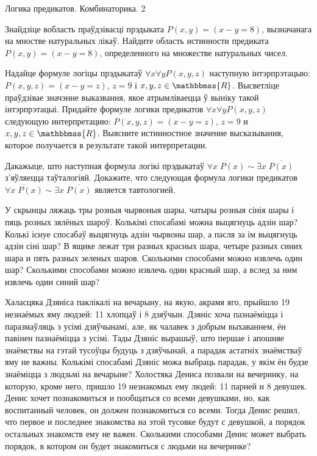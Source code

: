 \documentclass[11pt, a4paper]{article}
\begin{document}
\newpage

{Логика предикатов. Комбинаторика.}
{2}
 
\begin{problemList}

\problemItemSimple
{Знайдзіце вобласть праўдзівасці прэдыката $P(x, y) = (x - y = 8)$, вызначанага на мностве натуральных лікаў.}
{Найдите область истинности предиката $P(x, y) = (x - y = 8)$, определенного на множестве натуральных чисел.}

\medskip

\problemItemSimple
{Надайце формуле логіцы прэдыкатаў $\forall x \forall y P(x, y, z)$ наступную інтэрпрэтацыю: $P(x, y, z) = (x - y = z)$, $z = 9$ і $x, y, z \in \mathbbmss{R}$.
Высветліце праўдзівае значэнне выказвання, якое атрымліваецца ў выніку такой інтэрпрэтацыі.}
{Придайте формуле логики предикатов $\forall x \forall y P(x, y, z)$ следующую интерпретацию: $P(x, y, z) = (x - y = z)$, $z = 9$ и $x, y, z \in \mathbbmss{R}$.
Выясните истинностное значение высказывания, которое получается в результате такой интерпретации.}

\medskip

\problemItemSimple
{Дакажыце, што наступная формула логікі прэдыкатаў $\overline{\forall x\;P(x)} \sim \exists x\;\overline{P(x)}$ з'яўляецца таўталогіяй.}
{Докажите, что следующая формула логики предикатов $\overline{\forall x\;P(x)} \sim \exists x\;\overline{P(x)}$ является тавтологией.}

\medskip

\problemItemSimple
{У скрынцы ляжаць тры розныя чырвоныя шары, чатыры розныя сінія шары і пяць розных зялёных шароў.
Колькімі спосабамі можна выцягнуць адзін шар? Колькі існуе спосабаў выцягнуць адзін чырвоны шар,
а пасля за ім выцягнуць адзін сіні шар?}
{В ящике лежат три разных красных шара, четыре разных синих шара и пять разных зеленых шаров.
Сколькими способами можно извлечь один шар?
Сколькими способами можно извлечь один красный шар, а вслед за ним извлечь один синий шар?}

\medskip

\problemItemSimple
{Халасцяка Дзяніса паклікалі на вечарыну, на якую, акрамя яго, прыйшло 19 незнаёмых яму людзей: 11 хлопцаў і 8 дзяўчын.
Дзяніс хоча пазнаёміцца і паразмаўляць з усімі дзяўчынамі, але, як чалавек з добрым выхаваннем, ён павінен пазнаёміцца з усімі.
Тады Дзяніс вырашыў, што першае і апошняе знаёмствы на гэтай тусоўцы будуць з дзяўчынай, а парадак астатніх знаёмстваў яму не важны.
Колькімі спосабамі Дзяніс можа выбраць парадак, у якім ён будзе знаёміцца з людзьмі на вечарыне?}
{Холостяка Дениса позвали на вечеринку, на которую, кроме него, пришло 19 незнакомых ему людей: 11 парней и 8 девушек.
Денис хочет познакомиться и пообщаться со всеми девушками, но, как воспитанный человек, он должен познакомиться со всеми.
Тогда Денис решил, что первое и последнее знакомства на этой тусовке будут с девушкой, а порядок остальных знакомств ему не важен.
Сколькими способами Денис может выбрать порядок, в котором он будет знакомиться с людьми на вечеринке?}


\end{problemList}
\end{document}
